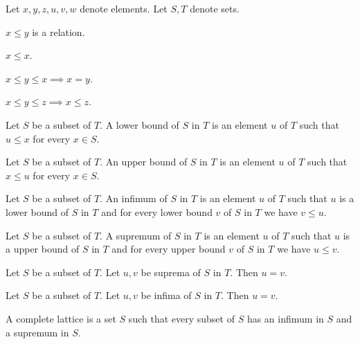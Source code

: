 \documentclass{article}
\begin{document}
  \begin{forthel}
    Let $x,y,z,u,v,w$ denote elements. Let $S,T$ denote sets.

    \begin{signature}
      $x \leq y$ is a relation.
    \end{signature}

    \begin{axiom}
      $x \leq x$.
    \end{axiom}

    \begin{axiom}
      $x \leq y \leq x \implies x = y$.
    \end{axiom}

    \begin{axiom}
      $x \leq y \leq z \implies x \leq z$.
    \end{axiom}

    \begin{definition}
      Let $S$ be a subset of $T$.
      A lower bound of $S$ in $T$ is an element $u$ of $T$ such that $u \leq x$
      for every $x \in S$.
    \end{definition}

    \begin{definition}
      Let $S$ be a subset of $T$.
      An upper bound of $S$ in $T$ is an element $u$ of $T$ such that $x \leq u$
      for every $x \in S$.
    \end{definition}

    \begin{definition}
      Let $S$ be a subset of $T$.
      An infimum of $S$ in $T$ is an element $u$ of $T$ such that $u$ is a lower
      bound of $S$ in $T$ and for every lower bound $v$ of $S$ in $T$ we have
      $v \leq u$.
    \end{definition}

    \begin{definition}
      Let $S$ be a subset of $T$.
      A supremum of $S$ in $T$ is an element $u$ of $T$ such that $u$ is a upper
      bound of $S$ in $T$ and for every upper bound $v$ of $S$ in $T$ we have
      $u \leq v$.
    \end{definition}

    \begin{lemma}
      Let $S$ be a subset of $T$. Let $u,v$ be suprema of $S$ in $T$.
      Then $u = v$.
    \end{lemma}

    \begin{lemma}
      Let $S$ be a subset of $T$. Let $u,v$ be infima of $S$ in $T$.
      Then $u = v$.
    \end{lemma}

    \begin{definition}
      A complete lattice is a set $S$ such that every subset of $S$ has an
      infimum in $S$ and a supremum in $S$.
    \end{definition}
  \end{forthel}
\end{document}
